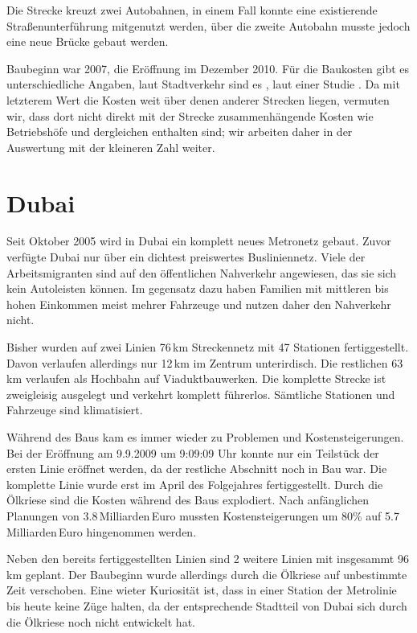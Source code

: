 Die Strecke kreuzt zwei Autobahnen, in einem Fall konnte eine existierende Straßenunterführung mitgenutzt werden, über die zweite Autobahn musste jedoch eine neue Brücke gebaut werden.


Baubeginn war 2007, die Eröffnung im Dezember 2010. Für die Baukosten gibt es unterschiedliche Angaben, laut Stadtverkehr \cite{tlsesv} sind es , laut einer Studie . Da mit letzterem Wert die Kosten weit über denen anderer Strecken liegen, vermuten wir, dass dort nicht direkt mit der Strecke zusammenhängende Kosten wie Betriebshöfe und dergleichen enthalten sind; wir arbeiten daher in der Auswertung mit der kleineren Zahl weiter.


\section{Dubai}

Seit Oktober 2005 wird in Dubai ein komplett neues Metronetz
gebaut. Zuvor verfügte Dubai nur über ein dichtest preiswertes
Busliniennetz. Viele der Arbeitsmigranten sind auf den öffentlichen
Nahverkehr angewiesen, das sie sich kein Autoleisten können. Im
gegensatz dazu haben Familien mit mittleren bis hohen Einkommen meist
mehrer Fahrzeuge und nutzen daher den Nahverkehr nicht.

Bisher wurden auf zwei Linien 76\,km Streckennetz mit 47 Stationen
fertiggestellt. Davon verlaufen allerdings nur 12\,km im Zentrum
unterirdisch. Die restlichen 63\,km verlaufen als Hochbahn auf
Viaduktbauwerken. Die komplette Strecke ist zweigleisig ausgelegt und
verkehrt komplett führerlos. Sämtliche Stationen und Fahrzeuge sind
klimatisiert. \cite{hallodubai}

Während des Baus kam es immer wieder zu Problemen und
Kostensteigerungen. Bei der Eröffnung am 9.9.2009 um 9:09:09 Uhr
konnte nur ein Teilstück der ersten Linie eröffnet werden, da der
restliche Abschnitt noch in Bau war. \cite{tnDubaiMetro} Die komplette
Linie wurde erst im April des Folgejahres fertiggestellt. Durch die
Ölkriese sind die Kosten während des Baus explodiert. Nach
anfänglichen Planungen von 3.8\,Milliarden\,Euro mussten
Kostensteigerungen um 80\% auf 5.7\,Milliarden\,Euro hingenommen
werden. \cite{gnCosts}


Neben den bereits fertiggestellten Linien sind 2 weitere Linien mit
insgesammt 96\,km geplant. Der Baubeginn wurde allerdings durch die
Ölkriese auf unbestimmte Zeit verschoben. \cite{rtDubaiMetro} Eine
wieter Kuriosität ist, dass in einer Station der Metrolinie bis heute
keine Züge halten, da der entsprechende Stadtteil von Dubai sich durch
die Ölkriese noch nicht entwickelt hat.

